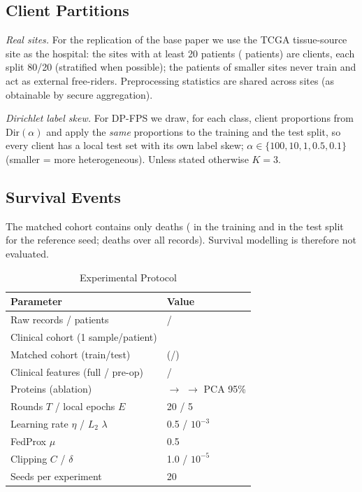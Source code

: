 \documentclass[journal]{IEEEtran}
\begin{document}
\subsection{Client Partitions}
\emph{Real sites.} For the replication of the base paper we use the TCGA tissue-source site as the hospital: the \nSites{} sites with at least 20 patients (\nSiteTotal{} patients) are clients, each split 80/20 (stratified when possible); the \nExternal{} patients of smaller sites never train and act as external free-riders. Preprocessing statistics are shared across sites (as obtainable by secure aggregation).

\emph{Dirichlet label skew.} For DP-FPS we draw, for each class, client proportions from $\mathrm{Dir}(\alpha)$ and apply the \emph{same} proportions to the training and the test split, so every client has a local test set with its own label skew; $\alpha \in \{100, 10, 1, 0.5, 0.1\}$ (smaller = more heterogeneous). Unless stated otherwise $K=3$.

\subsection{Survival Events}
The matched cohort contains only \nEvents{} deaths (\nEventsTrain{} in the training and \nEventsTest{} in the test split for the reference seed; \nEventsAll{} deaths over all \nRaw{} records). Survival modelling is therefore not evaluated.


\begin{table}[ht]
\caption{Experimental Protocol}
\centering
\footnotesize
\begin{tabular}{ll}
\toprule
Parameter & Value \\
\midrule
Raw records / patients & \nRaw{} / \nRawPatients{} \\
Clinical cohort (1 sample/patient) & \nClinical{} \\
Matched cohort (train/test) & \nMatched{} (\nTrain{}/\nTest{}) \\
Clinical features (full / pre-op) & \nFeatFull{} / \nFeatPreop{} \\
Proteins (ablation) & \nProteinRaw{} $\to$ \nProteinKept{} $\to$ PCA 95\% \\
Rounds $T$ / local epochs $E$ & 20 / 5 \\
Learning rate $\eta$ / $L_2$ $\lambda$ & 0.5 / $10^{-3}$ \\
FedProx $\mu$ & 0.5 \\
Clipping $C$ / $\delta$ & 1.0 / $10^{-5}$ \\
Seeds per experiment & 20 \\
\bottomrule
\end{tabular}
\label{tab:protocol}
\end{table}
\end{document}
